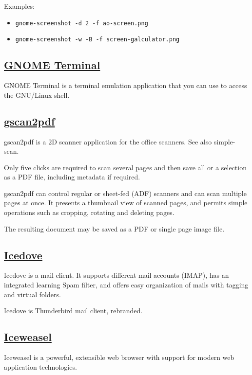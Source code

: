 Examples:
\begin{itemize}
 \item\texttt{gnome-screenshot -d 2 -f ao-screen.png}
 \item\texttt{gnome-screenshot -w -B -f screen-galculator.png}
\end{itemize}

\subsection{\href{}{GNOME Terminal}}

 GNOME Terminal is a terminal emulation application that you can use to
 access the GNU/Linux shell.

\subsection{\href{http://gscan2pdf.sourceforge.net/}{gscan2pdf}}

gscan2pdf is a 2D scanner application for the office scanners. See also
simple-scan.

 Only five clicks are required to scan several pages and then save all or a
 selection as a PDF file, including metadata if required.
 
 gscan2pdf can control regular or sheet-fed (ADF) scanners
 and can scan multiple pages at once.
 It presents a thumbnail view of scanned pages, and permits simple operations
 such as cropping, rotating and deleting pages.
 
 The resulting document may be saved as a PDF or
 single page image file.

\subsection{\href{http://www.mozilla.org/thunderbird/}{Icedove}}

 Icedove is a mail client.
 It supports different mail accounts (IMAP), has an
 integrated learning Spam filter, and offers easy organization of mails with
 tagging and virtual folders.
 
 Icedove is Thunderbird mail client, rebranded.

\subsection{\href{https://www.mozilla.org/en-US/firefox/desktop/}{Iceweasel}}

 Iceweasel is a powerful, extensible web browser
 with support for modern web application technologies.

